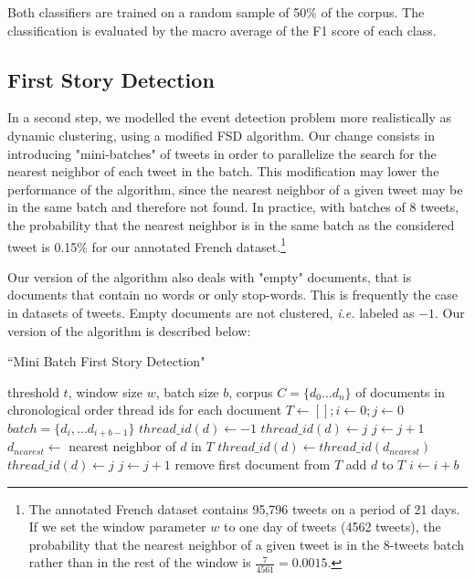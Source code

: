 Both classifiers are trained on a random sample of 50\% of the corpus. The classification is evaluated by the macro average of the F1 score of each class.

\subsection{First Story Detection}
\label{Subsec: FSD}
 In a second step, we modelled the event detection problem more realistically as dynamic clustering, using a modified FSD algorithm. Our change consists in introducing "mini-batches" of tweets in order to parallelize the search for the nearest neighbor of each tweet in the batch. This modification may lower the performance of the algorithm, since the nearest neighbor of a given tweet may be in the same batch and therefore not found. In practice, with batches of 8 tweets, the probability that the nearest neighbor is in the same batch as the considered tweet is 0.15\% for our annotated French dataset.\footnote{The annotated French dataset contains 95,796 tweets on a period of 21 days. If we set the window parameter $w$ to one day of tweets (4562 tweets), the probability that the nearest neighbor of a given tweet is in the 8-tweets batch rather than in the rest of the window is $\frac{7}{4561}=0.0015$.}
 
 Our version of the algorithm also deals with "empty" documents, that is documents that contain no words or only stop-words. This is frequently the case in datasets of tweets. Empty documents are not clustered, \textit{i.e.} labeled as $-1$. Our version of the algorithm is described below:
\label{FSD}
\begin{algorithm}
\caption{``Mini Batch First Story Detection"}
\begin{algorithmic}[1]
\REQUIRE threshold $t$, window size $w$, batch size $b$, corpus $C=\{d_0 \ldots d_n\}$ of documents in chronological order
\ENSURE thread ids for each document
\STATE $T \leftarrow \left[ \right] ; i \leftarrow 0  ; j \leftarrow 0 $
\STATE $batch = \{d_{i}, \ldots d_{i + b -1}\}$
    \STATE $thread\_id(d) \leftarrow -1$
    \ELSE
    \STATE $thread\_id(d) \leftarrow j$
    \STATE $j \leftarrow j+1$
    \ELSE
    \STATE $d_{nearest} \leftarrow $ nearest neighbor of $d$ in $T$
    \STATE $thread\_id(d) \leftarrow thread\_id(d_{nearest})$
    \ELSE
    \STATE $thread\_id(d) \leftarrow j$
    \STATE $j \leftarrow j+1$
    \ENDIF
    \ENDIF
    \STATE remove first document from $T$
    \ENDIF
    \ENDIF
    \STATE add $d$ to $T$
    \STATE $i \leftarrow i + b$
    \ENDFOR
\ENDWHILE
\end{algorithmic}
\end{algorithm}

